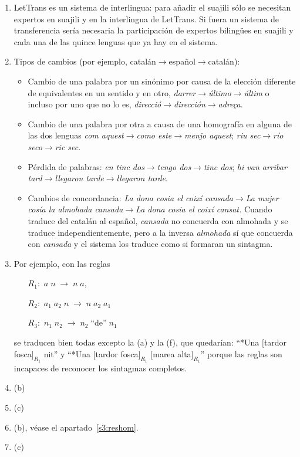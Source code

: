 \begin{enumerate}
\item LetTrans es un sistema de interlingua: para añadir el suajili sólo se necesitan expertos en suajili y en la interlingua de LetTrans. Si fuera un sistema de transferencia sería necesaria la participación de expertos bilingües en suajili y cada una de las quince lenguas que ya hay en el sistema. 

\item Tipos de cambios (por ejemplo, catalán$\to$español$\to$catalán): \begin{itemize} \item Cambio de una palabra por un sinónimo por causa de la elección diferente de equivalentes en un sentido y en otro, \emph{darrer}$\to$\emph{último}$\to$\emph{últim} o incluso por uno que no lo es, \emph{direcció}$\to$\emph{dirección}$\to$\emph{adreça}. \item Cambio de una palabra por otra a causa de una homografía en alguna de las dos lenguas \emph{com aquest}$\to$\emph{como este}$\to$\emph{menjo aquest}; \emph{riu sec}$\to$\emph{río seco}$\to$\emph{ric sec}. \item Pérdida de palabras: \emph{ en tinc dos}$\to$\emph{tengo dos}$\to$\emph{tinc dos}; \emph{ hi van arribar tard}$\to$\emph{llegaron tarde}$\to$\emph{llegaron tarde}. \item Cambios de concordancia: \emph{La dona cosia el coixí cansada}$\to$\emph{La mujer cosía la almohada cansada}$\to$\emph{La dona cosia el coixí cansat.} Cuando traduce del catalán al español, \emph{cansada} no concuerda con almohada y se traduce independientemente, pero a la inversa \emph{almohada} sí que concuerda con \emph{cansada} y el sistema los traduce como si formaran un sintagma. \end{itemize} 

\item Por ejemplo, con las reglas \begin{itemize} \item[$R_1:$] $a \;n\;\to\; n\; a$, \item[$R_2:$] $a_1\; a_2\;n\;\to\; n\; a_2\; a_1$ \item[$R_3:$] $n_1\; n_2\;\to\; n_2\; \mbox{``de''}\; n_1$ \end{itemize} se traducen bien todas excepto la (a) y la (f), que quedarían: ``*Una $[$tardor fosca$]_{R_1}$ nit'' y ``*Una $[$tardor fosca$]_{R_1}$ $[$marea alta$]_{R_1}$'' porque las reglas son incapaces de reconocer los sintagmas completos. 

\item (b) \item (c) \item (b), véase el apartado~\ref{s3:reshom}. \item (c) 


\end{enumerate}
